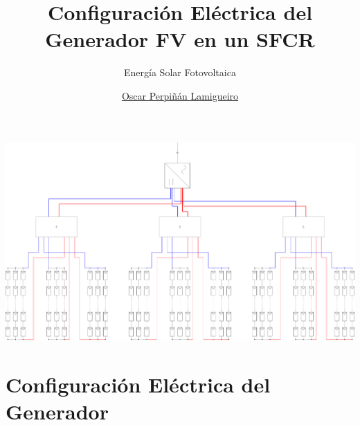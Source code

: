 \documentclass[aspectratio=169, usenames,svgnames,dvipsnames]{beamer}
\author{\href{https://oscarperpinan.github.io}{Oscar Perpiñán Lamigueiro}}
\date{}
\title{Configuración Eléctrica del Generador FV en un SFCR}
\subtitle{Energía Solar Fotovoltaica}
\institute[UPM]{Universidad Politécnica de Madrid}
\begin{document}
\maketitle
\begin{frame}[label={sec:org64a6d4c},plain]{}
\begin{center}
\includegraphics[width=\textwidth]{../figs/CableadoCentral.pdf}
\end{center}
\end{frame}
\section{Configuración Eléctrica del Generador}
\label{sec:org138e525}
\end{document}
